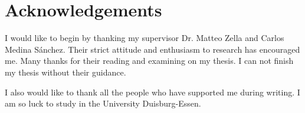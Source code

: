 \chapter{Acknowledgements}



I would like to begin by thanking my supervisor Dr. Matteo Zella and Carlos Medina Sánchez. Their strict attitude and enthusiasm to research has encouraged me. Many thanks for their reading and examining on my thesis. I can not finish my thesis without their guidance.

I also would like to thank all the people who have supported me during writing. I am so luck to study in the University Duisburg-Essen.